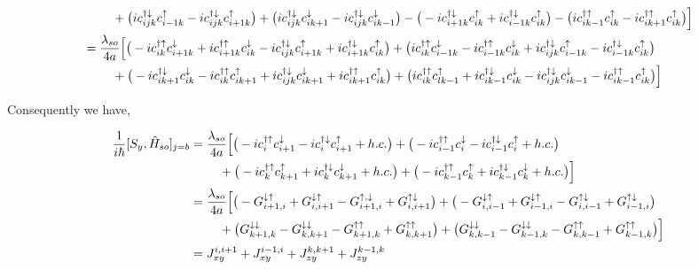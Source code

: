 \documentclass[10pt,prb,showpacs,amssymb,floatfix]{revtex4-1}
\newcommand{\dg}{\dagger}
\newcommand{\dna}{\downarrow}
\newcommand{\nn}{\nonumber}
\newcommand{\upa}{\uparrow}
\newcommand{\h}{\hat}
\begin{document}
\begin{align}
& ~~~~~~~ +     \big{(}i  c_{ijk}^{\dg\dna}  c_{i-1 k}^\uparrow - i   c_{ijk}^{\dg\dna}  c_{i+1k}^{\uparrow}   \big{)} +  \big{(} i  c_{ijk}^{\dg\dna}  c_{i k+1}^{ \downarrow}    - i   c_{ijk}^{\dg\dna}  c_{ik-1}^\downarrow  \big{)}   -  \big{(}  - i c_{i+1k}^{\dagger \downarrow}c_{ik}^{\upa}  + i c_{i-1k}^{\dagger \downarrow}c_{ik}^{\upa}  \big{)}  -  \big{(} i c_{i k-1}^{\dagger \uparrow}c_{ik}^{\upa}     - i c_{ik+1}^{\dagger \uparrow}c_{ik}^{\upa}    \big{)}  \Big{]}   \nn\\
&= \frac{\lambda_{so}}{4a} \Big{[}    \big{(}   - i c_{ik}^{\dg\upa}  c_{i+1k}^{\downarrow}  + i c_{i+1k}^{\dagger \uparrow} c_{ik}^{\dna}  - i   c_{ijk}^{\dg\dna}  c_{i+1k}^{\uparrow} +  i c_{i+1k}^{\dagger \downarrow}c_{ik}^{\upa}  \big{)}  +  \big{(} i  c_{ik}^{\dg\upa}  c_{i-1k}^\downarrow  - i c_{i-1 k}^{\dagger \uparrow} c_{ik}^{\dna} + i  c_{ijk}^{\dg\dna}  c_{i-1 k}^\uparrow   - i c_{i-1k}^{\dagger \downarrow}c_{ik}^{\upa}  \big{)}     \nn\\
& ~~~~~~~ + \big{(} -i c_{i k+1}^{\dagger \downarrow}  c_{ik}^{\dna}  - i  c_{ik}^{\dg\upa}  c_{i k+1}^{\uparrow} + i  c_{ijk}^{\dg\dna}  c_{i k+1}^{ \downarrow} +  i c_{ik+1}^{\dagger \uparrow}c_{ik}^{\upa}  \big{)}  +   \big{(} i  c_{ik}^{\dg\upa} c_{l k-1}^\uparrow  +  i c_{i k-1}^{\dagger  \downarrow} c_{ik}^{\dna}   - i   c_{ijk}^{\dg\dna}  c_{ik-1}^\downarrow   - i c_{i k-1}^{\dagger \uparrow}c_{ik}^{\upa}  \big{)}    \Big{]} 
\end{align}

Consequently we have,

\begin{align}
\frac{1}{i\hbar}[S_y, \h H_{so}]_{j=b} &=\frac{\lambda_{so}}{4a} \Big{[}    \big{(}   - i c_{i}^{\dg\upa}  c_{i+1}^{\downarrow}   - i   c_{i}^{\dg\dna}  c_{i+1}^{\uparrow} + h.c.  \big{)}  +  \big{(}  - i c_{i-1 }^{\dagger \uparrow} c_{i}^{\dna}   - i c_{i-1}^{\dagger \downarrow}c_{i}^{\upa} + h.c. \big{)}     \nn\\
& ~~~~~~~ + \big{(}  - i  c_{k}^{\dg\upa}  c_{k+1}^{\uparrow} + i  c_{k}^{\dg\dna}  c_{k+1}^{ \downarrow} + h.c. \big{)}  +   \big{(}     - i c_{k-1}^{\dagger \uparrow}c_{k}^{\upa} + i c_{k-1}^{\dagger  \downarrow} c_{k}^{\dna}   + h.c. \big{)}    \Big{]} \nn\\
&=\frac{\lambda_{so}}{4a} \Big{[}    \big{(}   - G_{i+1,i}^{\dna\upa}   + G_{i,i+1}^{\dna\upa}   - G_{i+1,i}^{\upa,\dna}  +  G_{i,i+1}^{\upa\dna}  \big{)}  +  \big{(}  - G_{i,i-1}^{\dna\upa} + G_{i-1,i}^{\dna\upa} - G_{i,i-1}^{\upa \dna} + G_{i-1,i}^{\upa\dna}    \big{)}     \nn\\
& ~~~~~~~ + \big{(} G_{k+1,k}^{\dna\dna} - G_{k,k+1}^{\dna\dna}   - G_{k+1,k}^{\upa\upa}    +  G_{k,k+1}^{\upa\upa}  \big{)}  +   \big{(} G_{k,k-1}^{\dna\dna} - G_{k-1,k}^{\dna\dna}      - G_{k,k-1}^{\upa\upa} + G_{k-1,k}^{\upa\upa}   \big{)}    \Big{]} \nn\\
&= J_{xy}^{i,i+1} + J_{xy}^{i-1,i} + J_{zy}^{k,k+1} +   J_{zy}^{k-1,k}
\end{align}
\end{document}
